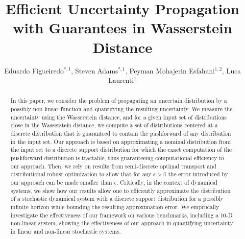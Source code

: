 \documentclass[11pt, a4paper, oneside,reqno]{amsart}
\author@andify\authors
\title[Efficient Uncertainty Propagation with Guarantees in Wasserstein Distance]{Efficient Uncertainty Propagation \\ with Guarantees in Wasserstein Distance}
\author{Eduardo Figueiredo$^{*,1}$, Steven Adams$^{*,1}$, Peyman Mohajerin Esfahani$^{1,2}$, Luca Laurenti$^{1}$
}
\theoremstyle{plain}
\begin{document}
\maketitle

\begin{abstract}
In this paper, we consider the problem of propagating an uncertain distribution by a possibly non-linear function and quantifying the resulting uncertainty. We measure the uncertainty using the Wasserstein distance, and for a given input set of distributions close in the Wasserstein distance, we compute a set of distributions centered at a discrete distribution that is guaranteed to contain the pushforward of any distribution in the input set. 
Our approach is based on approximating a nominal distribution from the input set to a discrete support distribution for which the exact computation of the pushforward distribution is tractable,  thus guaranteeing computational efficiency to our approach. Then, we rely on results from semi-discrete optimal transport and distributional robust optimization to show that for any $\epsilon > 0$ the error introduced by our approach can be made smaller than $\epsilon$. Critically, in the context of dynamical systems, we show how our results allow one to efficiently approximate the distribution of a stochastic dynamical system with a discrete support distribution for a possibly infinite horizon while bounding the resulting approximation error. 
We empirically investigate the effectiveness of our framework on various benchmarks, including a 10-D non-linear system, showing the effectiveness of our approach in quantifying uncertainty in linear and non-linear stochastic systems.  
\end{abstract}
\end{document}
